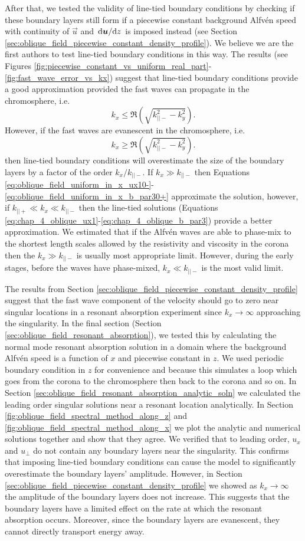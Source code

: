 After that, we tested the validity of line-tied boundary conditions by checking if these boundary layers still form if a piecewise constant background Alfv\'en speed with continuity of $\vec{u}$ and $\dv*{\boldsymbol{u}}{z}$ is imposed instead (see Section \ref{sec:oblique_field_piecewise_constant_density_profile}). We believe we are the first authors to test line-tied boundary conditions in this way. The results (see Figures \ref{fig:piecewise_constant_vs_uniform_real_part}-\ref{fig:fast_wave_error_vs_kx}) suggest that line-tied boundary conditions provide a good approximation provided the fast waves can propagate in the chromosphere, i.e.
\[k_x \le \Re(\sqrt{k_{||-}^2 - k_y^2}).\]
However, if the fast waves are evanescent in the chromosphere, i.e. 
\[k_x \ge \Re(\sqrt{k_{||-}^2 - k_y^2}).\]
then line-tied boundary conditions will overestimate the size of the boundary layers by a factor of the order $k_x / k_{||-}$. If $k_x\gg k_{||-}$ then Equations \eqref{eq:oblique_field_uniform_in_x_ux10-}-\eqref{eq:oblique_field_uniform_in_x_b_par30+} approximate the solution, however, if $k_{||+} \ll k_x\ll k_{||-}$ then the line-tied solutions (Equations \ref{eq:chap_4_oblique_ux1}-\ref{eq:chap_4_oblique_b_par3}) provide a better approximation. We estimated that if the Alfv\'en waves are able to phase-mix to the shortest length scales allowed by the resistivity and viscosity in the corona then the $k_x\gg k_{||-}$ is usually most appropriate limit. However, during the early stages, before the waves have phase-mixed, $k_x\ll k_{||-}$ is the most valid limit.

The results from Section \ref{sec:oblique_field_piecewise_constant_density_profile} suggest that the fast wave component of the velocity should go to zero near singular locations in a resonant absorption experiment since $k_x\rightarrow \infty$ approaching the singularity. In the final section (Section \ref{sec:oblique_field_resonant_absorption}), we tested this by calculating the normal mode resonant absorption solution in a domain where the background Alfv\'en speed is a function of $x$ and piecewise constant in $z$. We used periodic boundary condition in $z$ for convenience and because this simulates a loop which goes from the corona to the chromosphere then back to the corona and so on. In Section \ref{sec:oblique_field_resonant_absorption_analytic_soln} we calculated the leading order singular solutions near a resonant location analytically. In Section \ref{fig:oblique_field_spectral_method_along_z} and \ref{fig:oblique_field_spectral_method_along_x} we plot the analytic and numerical solutions together and show that they agree. We verified that to leading order, $u_x$ and $u_\perp$ do not contain any boundary layers near the singularity. This confirms that imposing line-tied boundary conditions can cause the model to significantly overestimate the boundary layers' amplitude. However, in Section \ref{sec:oblique_field_piecewise_constant_density_profile} we showed as $k_x\rightarrow\infty$ the amplitude of the boundary layers does not increase. This suggests that the boundary layers have a limited effect on the rate at which the resonant absorption occurs. Moreover, since the boundary layers are evanescent, they cannot directly transport energy away.

